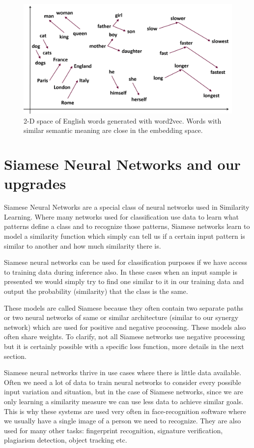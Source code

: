 \documentclass[b5paper]{book}
\let\cite\parencite
\begin{document}
\begin{figure}
    \centering
    \includegraphics[scale=0.2]{figures/word2vec.png}    \caption{2-D space of English words generated with word2vec. Words with similar semantic meaning are close in the embedding space.}
    \label{fig:word2vec}
\end{figure}


\chapter{Siamese Neural Networks and our upgrades}

Siamese Neural Networks \cite{koch2015siamese} are a special class of neural networks used in Similarity Learning. Where many networks used for classification use data to learn what patterns define a class and to recognize those patterns, Siamese networks learn to model a similarity function which simply can tell us if a certain input pattern is similar to another and how much similarity there is.

Siamese neural networks can be used for classification purposes if we have access to training data during inference also. In these cases when an input sample is presented we would simply try to find one similar to it in our training data and output the probability (similarity) that the class is the same. 

These models are called Siamese because they often contain two separate paths or two neural networks of same or similar architecture (similar to our synergy network) which are used for positive and negative processing. These models also often share weights. To clarify, not all Siamese networks use negative processing but it is certainly possible with a specific loss function, more details in the next section.

Siamese neural networks thrive in use cases where there is little data available. Often we need a lot of data to train neural networks to consider every possible input variation and situation, but in the case of Siamese networks, since we are only learning a similarity measure we can use less data to achieve similar goals. This is why these systems are used very often in face-recognition software where we usually have a single image of a person we need to recognize. They are also used for many other tasks: fingerprint recognition, signature verification, plagiarism detection, object tracking etc.
\end{document}
